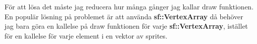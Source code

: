 \documentclass{TDP003mall}
\begin{document}
För att lösa det måste jag reducera hur många gånger jag kallar draw funktionen. En populär lösning på problemet är att använda \textbf{sf::VertexArray} 
då behöver jag bara göra en kallelse på draw funktionen för varje \textbf{sf::VertexArray}, istället för en kallelse för varje element i en vektor av sprites.
\end{document}
